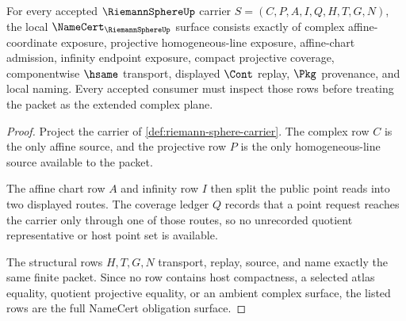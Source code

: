 \begin{theorem}
\label{thm:riemann-sphere-namecert-obligations}
For every accepted $\RiemannSphereUp$ carrier $S=(C,P,A,I,Q,H,T,G,N)$, the local $\NameCert_{\RiemannSphereUp}$ surface consists exactly of complex affine-coordinate exposure, projective homogeneous-line exposure, affine-chart admission, infinity endpoint exposure, compact projective coverage, componentwise $\hsame$ transport, displayed $\Cont$ replay, $\Pkg$ provenance, and local naming. Every accepted consumer must inspect those rows before treating the packet as the extended complex plane.
\end{theorem}
\begin{proof}
Project the carrier of \autoref{def:riemann-sphere-carrier}. The complex row $C$ is the only affine source, and the projective row $P$ is the only homogeneous-line source available to the packet.

The affine chart row $A$ and infinity row $I$ then split the public point reads into two displayed routes. The coverage ledger $Q$ records that a point request reaches the carrier only through one of those routes, so no unrecorded quotient representative or host point set is available.

The structural rows $H,T,G,N$ transport, replay, source, and name exactly the same finite packet. Since no row contains host compactness, a selected atlas equality, quotient projective equality, or an ambient complex surface, the listed rows are the full NameCert obligation surface.
\end{proof}

